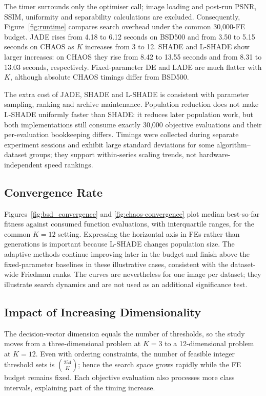\documentclass[review,authoryear]{elsarticle}
\begin{document}
The timer surrounds only the optimiser call; image loading and post-run PSNR,
SSIM, uniformity and separability calculations are excluded. Consequently,
Figure~\ref{fig:runtime} compares search overhead under the common 30,000-FE
budget. JADE rises from 4.18 to 6.12 seconds on BSD500 and from 3.50 to
5.15 seconds on CHAOS as $K$ increases from 3 to 12. SHADE and L-SHADE show
larger increases: on CHAOS they rise from 8.42 to 13.55 seconds and from
8.31 to 13.03 seconds, respectively. Fixed-parameter DE and LADE are much
flatter with $K$, although absolute CHAOS timings differ from BSD500.

The extra cost of JADE, SHADE and L-SHADE is consistent with parameter
sampling, ranking and archive maintenance. Population reduction does not make
L-SHADE uniformly faster than SHADE: it reduces later population work, but
both implementations still consume exactly 30,000 objective evaluations and
their per-evaluation bookkeeping differs. Timings were collected during
separate experiment sessions and exhibit large standard deviations for some
algorithm--dataset groups; they support within-series scaling trends, not
hardware-independent speed rankings.


\subsection{Convergence Rate}

Figures~\ref{fig:bsd_convergence} and \ref{fig:chaos-convergence} plot median
best-so-far fitness against consumed function evaluations, with interquartile
ranges, for the common $K=12$ setting. Expressing the horizontal axis in FEs
rather than generations is important because L-SHADE changes population size.
The adaptive methods continue improving later in the budget and finish above
the fixed-parameter baselines in these illustrative cases, consistent with
the dataset-wide Friedman ranks. The curves are nevertheless for one image
per dataset; they illustrate search dynamics and are not used as an additional
significance test.


\subsection{Impact of Increasing Dimensionality}

The decision-vector dimension equals the number of thresholds, so the study
moves from a three-dimensional problem at $K=3$ to a 12-dimensional problem
at $K=12$. Even with ordering constraints, the number of feasible integer
threshold sets is $\binom{254}{K}$; hence the search space grows rapidly while
the FE budget remains fixed. Each objective evaluation also processes more
class intervals, explaining part of the timing increase.
\end{document}
